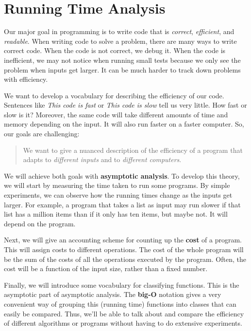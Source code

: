 \chapter{Running Time Analysis}


Our major goal in programming is to write code that is \emph{correct}, \emph{efficient}, and \emph{readable}.
When writing code to solve a problem, there are many ways to write correct code.
When the code is not correct, we debug it.
When the code is inefficient, we may not notice when running small tests because we only see the problem when inputs get larger.
It can be much harder to track down problems with efficiency.


We want to develop a vocabulary for describing the efficiency of our code.
Sentences like \emph{This code is fast} or \emph{This code is slow} tell us very little.
How fast or slow is it?
Moreover, the same code will take different amounts of time and memory depending on the input.
It will also run faster on a faster computer.
So, our goals are challenging:

\begin{quote}

We want to give a nuanced description of the efficiency of a program that adapts to \emph{different inputs} and to \emph{different computers}.

\end{quote}

We will achieve both goals with \textbf{asymptotic analysis}.
To develop this theory, we will start by measuring the time taken to run some programs.
By simple experiments, we can observe how the running times change as the inputs get larger.
For example, a program that takes a list as input may run slower if that list has a million items than if it only has ten items, but maybe not.
It will depend on the program.


Next, we will give an accounting scheme for counting up the \textbf{cost} of a program.
This will assign costs to different operations.
The cost of the whole program will be the sum of the costs of all the operations executed by the program.
Often, the cost will be a function of the input size, rather than a fixed number.


Finally, we will introduce some vocabulary for classifying functions.
This is the asymptotic part of asymptotic analysis.
The \textbf{big-O} notation gives a very convenient way of grouping this (running time) functions into classes that can easily be compared.
Thus, we'll be able to talk about and compare the efficiency of different algorithms or programs without having to do extensive experiments.



